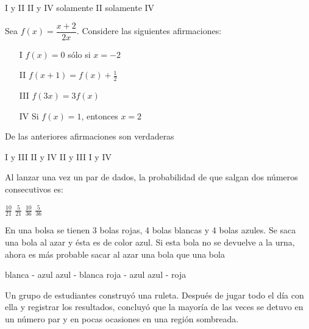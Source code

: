 \documentclass[10pt,letterpaper,addpoints]{exam}
\begin{document}
\begin{questions}
\begin{oneparchoices}
\CorrectChoice I y II
\choice II y IV
\choice solamente II
\choice solamente IV
\end{oneparchoices}
\question Sea $ f(x)=\dfrac{x+2}{2x} $. Considere las siguientes afirmaciones:
\begin{multicols}{2}
      \begin{itemize}
        \item[I] $ f(x)=0 $ sólo si $ x=-2 $
        \item[II] $ f(x+1)=f(x)+\frac{1}{2} $
        \item[III] $ f(3x)=3f(x) $
        \item[IV] Si $ f(x)=1 $, entonces $ x=2 $
      \end{itemize}
          \end{multicols}
De las anteriores afirmaciones son  verdaderas

\begin{oneparchoices}
\choice I y III
\choice II y IV
\choice II y III
\CorrectChoice I y IV
\end{oneparchoices}
\question Al lanzar una vez un par de dados, la probabilidad de que salgan dos números consecutivos es:

\begin{oneparchoices}
\choice $ \frac{10}{21} $
\choice $ \frac{5}{21} $
\CorrectChoice $ \frac{10}{36} $
\choice $ \frac{5}{36} $
\end{oneparchoices}
\question En una bolsa se tienen 3 bolas rojas, 4 bolas blancas y 4 bolas azules. Se saca una bola al azar y ésta es de color azul. Si esta bola no se devuelve a la urna, ahora es más probable sacar al azar una bola \underline{\hspace{1.5cm}} que una bola \underline{\hspace{1.5cm}}

\begin{oneparchoices}
\CorrectChoice blanca - azul
\choice azul - blanca
\choice roja - azul
\choice azul - roja
\end{oneparchoices}
\question Un grupo de estudiantes construyó una ruleta. Después de jugar todo el día con ella y registrar los resultados, concluyó que la mayoría de las veces se detuvo en un número par y en pocas ocasiones en una región sombreada.\\


\end{questions}
\end{document}
